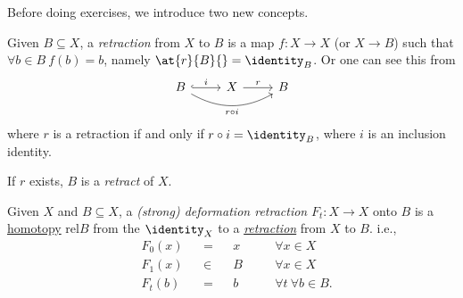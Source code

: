 \hr

Before doing exercises, we introduce two new concepts.
\begin{definition}\label{def:retraction}
	Given \(B\subseteq X\), a \emph{retraction} from \(X\) to \(B\) is a map \(f\colon X\to X\) (or \(X\to B\))
	such that \(\forall b\in B\ f(b) = b\), namely \(\at{r}{B}{} = \identity_B\). Or one can see this from
	\[
		\begin{tikzcd}
			B \ar[rr, swap, bend right=30, "r \circ i"] \ar[r,hook,"i"] & X \ar[r, "r"] & B
		\end{tikzcd}
	\]
	where \(r\) is a retraction if and only if \(r\circ i = \identity_B\), where \(i\) is an inclusion identity.

	\par If \(r\) exists, \(B\) is a \emph{retract} of \(X\).
\end{definition}
\begin{definition}\label{def:deformation-retraction}
	Given \(X\) and \(B\subseteq X\), a \emph{(strong) deformation retraction} \(F_t\colon X\to X\) onto \(B\) is
	a \hyperref[def:homotopy]{homotopy} \(\mathrm{rel} B\) from the \(\identity_X\) to a \hyperref[def:retraction]{\emph{retraction}}
	from \(X\) to \(B\). i.e.,
	\[
		\begin{alignedat}{4}
			&F_0(x) &&= &&x\quad &&\forall x\in X\\
			&F_1(x) &&\in &&B\quad &&\forall x\in X\\
			&F_t(b) &&= &&b\quad &&\forall t\ \forall b\in B.
		\end{alignedat}
	\]
\end{definition}

